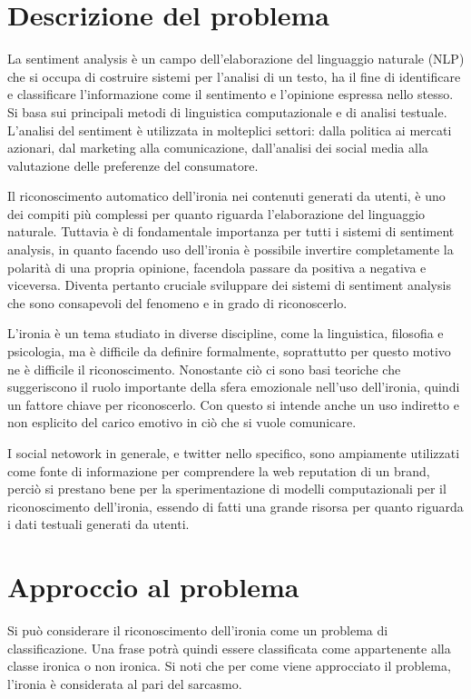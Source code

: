 \documentclass[oneside]{book}
\begin{document}
\section{Descrizione del problema}

La sentiment analysis è un campo dell'elaborazione del linguaggio naturale (NLP) che si occupa di costruire sistemi per l'analisi di un testo, ha il fine di identificare e classificare l'informazione come il sentimento e l'opinione espressa nello stesso. Si basa sui principali metodi di linguistica computazionale e di analisi testuale. L'analisi del sentiment è utilizzata in molteplici settori: dalla politica ai mercati azionari, dal marketing alla comunicazione, dall'analisi dei social media alla valutazione delle preferenze del consumatore. 

Il riconoscimento automatico dell'ironia nei contenuti generati da utenti, è uno dei compiti più complessi per quanto riguarda l'elaborazione del linguaggio naturale. Tuttavia è di fondamentale importanza per tutti i sistemi di sentiment analysis, in quanto facendo uso dell'ironia è possibile invertire completamente la polarità di una propria opinione, facendola passare da positiva a negativa e viceversa.
Diventa pertanto cruciale sviluppare dei sistemi di sentiment analysis che sono consapevoli del fenomeno e in grado di riconoscerlo.

L'ironia è un tema studiato in diverse discipline, come la linguistica, filosofia e psicologia, ma è difficile da definire formalmente, soprattutto per questo motivo ne è difficile il riconoscimento. Nonostante ciò ci sono basi teoriche che suggeriscono il ruolo importante della sfera emozionale nell'uso dell'ironia, quindi un fattore chiave per riconoscerlo. Con questo si intende anche un uso indiretto e non esplicito del carico emotivo in ciò che si vuole comunicare.

I social netowork in generale, e twitter nello specifico, sono ampiamente utilizzati come fonte di informazione per comprendere la web reputation di un brand, perciò si prestano bene per la sperimentazione di modelli computazionali per il riconoscimento dell'ironia, essendo di fatti una grande risorsa per quanto riguarda i dati testuali generati da utenti.


\section{Approccio al problema}
Si può considerare il riconoscimento dell'ironia come un problema di classificazione. Una frase potrà quindi essere classificata come appartenente alla classe ironica o non ironica. Si noti che per come viene approcciato il problema, l'ironia è considerata al pari del sarcasmo.
\end{document}
